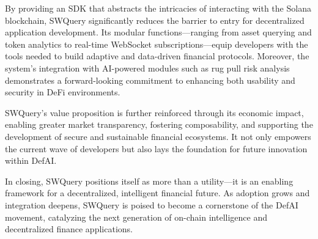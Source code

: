 \documentclass[
]{article}
\begin{document}
By providing an SDK that abstracts the intricacies of interacting with the Solana blockchain, SWQuery significantly reduces the barrier to entry for decentralized application development. Its modular functions---ranging from asset querying and token analytics to real-time WebSocket subscriptions---equip developers with the tools needed to build adaptive and data-driven financial protocols. Moreover, the system’s integration with AI-powered modules such as rug pull risk analysis demonstrates a forward-looking commitment to enhancing both usability and security in DeFi environments.

SWQuery’s value proposition is further reinforced through its economic impact, enabling greater market transparency, fostering composability, and supporting the development of secure and sustainable financial ecosystems. It not only empowers the current wave of developers but also lays the foundation for future innovation within DefAI.

In closing, SWQuery positions itself as more than a utility—it is an enabling framework for a decentralized, intelligent financial future. As adoption grows and integration deepens, SWQuery is poised to become a cornerstone of the DefAI movement, catalyzing the next generation of on-chain intelligence and decentralized finance applications.

\printbibliography
\end{document}
